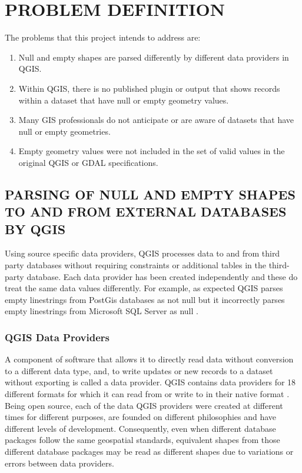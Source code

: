 \documentclass[letterpaper,10pt,english]{sphinxmanual}
\begin{document}
\section{PROBLEM DEFINITION}
\label{\detokenize{concept:problem-definition}}
The problems that this project intends to address are:
\begin{enumerate}
\def\theenumi{\arabic{enumi}}
\def\labelenumi{\theenumi .}
\makeatletter\def\p@enumii{\p@enumi \theenumi .}\makeatother
\item {} 
Null and empty shapes are parsed differently by different data providers in QGIS.

\item {} 
Within QGIS, there is no published plugin or output that shows records within a dataset that have null or empty geometry values.

\item {} 
Many GIS professionals do not anticipate or are aware of datasets that have null or empty geometries.

\item {} 
Empty geometry values were not included in the set of valid values in the original QGIS or GDAL specifications.

\end{enumerate}


\subsection{PARSING OF NULL AND EMPTY SHAPES TO AND FROM EXTERNAL DATABASES BY QGIS}
\label{\detokenize{concept:parsing-of-null-and-empty-shapes-to-and-from-external-databases-by-qgis}}
Using source specific data providers, QGIS processes data to and from third party databases without requiring constraints or additional tables in the third-party database.  Each data provider has been created independently and these do treat the same data values differently.  For example, as expected QGIS parses empty linestrings from PostGis databases as not null but it incorrectly parses empty linestrings from Microsoft SQL Server as null .


\subsubsection{QGIS Data Providers}
\label{\detokenize{concept:qgis-data-providers}}
A component of software that allows it to directly read data without conversion to a different data type, and, to write updates or new records to a dataset without exporting is called a data provider.   QGIS contains data providers for 18 different formats for which it can read from or write to in their native format .  Being open source, each of the data QGIS providers were created at different times for different purposes, are founded on different philosophies and have different levels of development.  Consequently, even when different database packages follow the same geospatial standards, equivalent shapes from those different database packages may be read as different shapes due to variations or errors between data providers.
\end{document}
